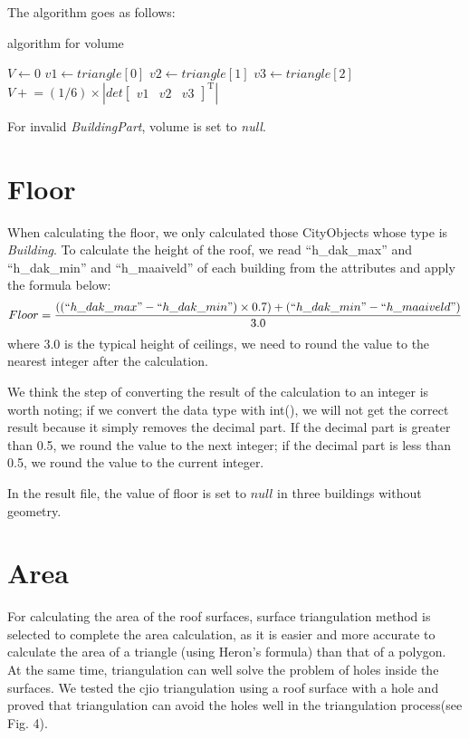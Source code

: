 \documentclass[12pt]{article}
\begin{document}
The algorithm goes as follows:
\begin{algorithm}
\caption{algorithm for volume}
\begin{algorithmic}
    \State $V \gets 0$
        \State $v1 \gets triangle[0]$ 
        \State $v2 \gets triangle[1]$
        \State $v3 \gets triangle[2]$
        \State $V \mathrel{+}= (1/6)\times \left | det\begin{bmatrix}
        v1 &  v2& v3
        \end{bmatrix}^ \mathrm{ T }  \right |$
    \EndFor
\EndFor
\end{algorithmic}
\end{algorithm}

For invalid \textit{BuildingPart}, volume is set to \textit{null}.

\section{Floor}
When calculating the floor, we only calculated those CityObjects whose type is \textit{Building}. To calculate the height of the roof, we read ``h\_dak\_max'' and ``h\_dak\_min'' and ``h\_maaiveld'' of each building from the attributes and apply the formula below:
\begin{equation} %
     Floor = \frac{((``h\_dak\_max" - ``h\_dak\_min")\times 0.7)+(``h\_dak\_min" - ``h\_maaiveld")}{3.0}
\end{equation}
where 3.0 is the typical height of ceilings, we need to round the value to the nearest integer after the calculation.

We think the step of converting the result of the calculation to an integer is worth noting; if we convert the data type with int(), we will not get the correct result because it simply removes the decimal part. If the decimal part is greater than 0.5, we round the value to the next integer; if the decimal part is less than 0.5, we round the value to the current integer.

In the result file, the value of floor is set to $null$ in three buildings without geometry.

\section{Area}
For calculating the area of the roof surfaces, surface triangulation method is selected to complete the area calculation, as it is easier and more accurate to calculate the area of a triangle (using Heron's formula) than that of a polygon. At the same time, triangulation can well solve the problem of holes inside the surfaces. We tested the cjio triangulation using a roof surface with a hole and proved that triangulation can avoid the holes well in the triangulation process(see Fig. 4).
\end{document}
